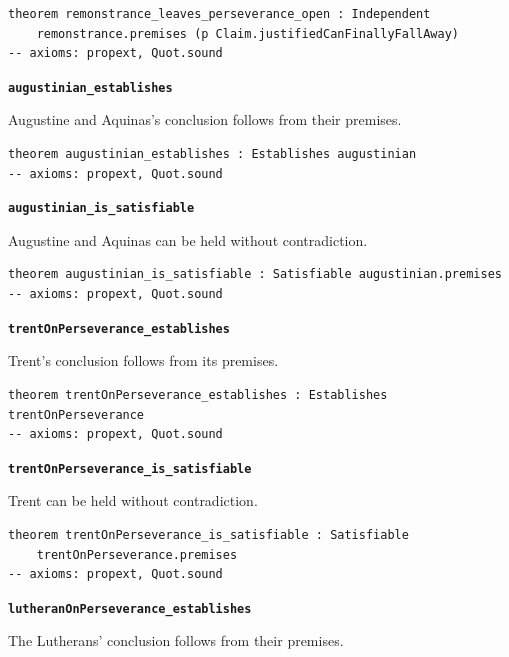 \documentclass[11pt]{article}
\begin{document}
{\small\begin{verbatim}
theorem remonstrance_leaves_perseverance_open : Independent
    remonstrance.premises (p Claim.justifiedCanFinallyFallAway)
-- axioms: propext, Quot.sound
\end{verbatim}}
\par\medskip\noindent\textbf{\texttt{augustinian\_\allowbreak{}establishes}}\par\nobreak\noindent
Augustine and Aquinas’s conclusion follows from their premises.

{\small\begin{verbatim}
theorem augustinian_establishes : Establishes augustinian
-- axioms: propext, Quot.sound
\end{verbatim}}
\par\medskip\noindent\textbf{\texttt{augustinian\_\allowbreak{}is\_\allowbreak{}satisfiable}}\par\nobreak\noindent
Augustine and Aquinas can be held without contradiction.

{\small\begin{verbatim}
theorem augustinian_is_satisfiable : Satisfiable augustinian.premises
-- axioms: propext, Quot.sound
\end{verbatim}}
\par\medskip\noindent\textbf{\texttt{trent\allowbreak{}On\allowbreak{}Perseverance\_\allowbreak{}establishes}}\par\nobreak\noindent
Trent’s conclusion follows from its premises.

{\small\begin{verbatim}
theorem trentOnPerseverance_establishes : Establishes trentOnPerseverance
-- axioms: propext, Quot.sound
\end{verbatim}}
\par\medskip\noindent\textbf{\texttt{trent\allowbreak{}On\allowbreak{}Perseverance\_\allowbreak{}is\_\allowbreak{}satisfiable}}\par\nobreak\noindent
Trent can be held without contradiction.

{\small\begin{verbatim}
theorem trentOnPerseverance_is_satisfiable : Satisfiable
    trentOnPerseverance.premises
-- axioms: propext, Quot.sound
\end{verbatim}}
\par\medskip\noindent\textbf{\texttt{lutheran\allowbreak{}On\allowbreak{}Perseverance\_\allowbreak{}establishes}}\par\nobreak\noindent
The Lutherans’ conclusion follows from their premises.
\end{document}
